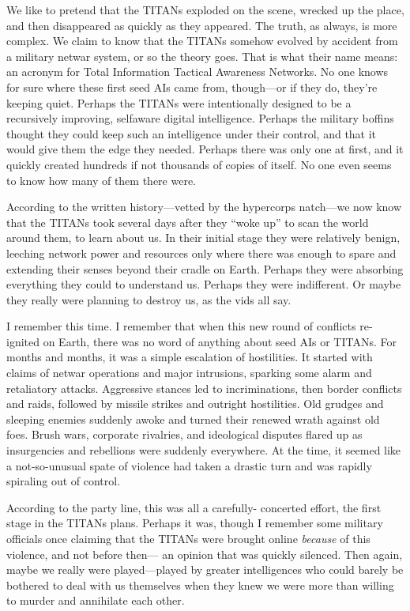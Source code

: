 We like to pretend that the TITANs exploded on 
the scene, wrecked up the place, and then disappeared 
as quickly as they appeared. The truth, as always, is 
more complex. We claim to know that the TITANs 
somehow evolved by accident from a military netwar 
system, or so the theory goes. That is what their name 
means: an acronym for Total Information Tactical 
Awareness Networks. No one knows for sure where 
these first seed AIs came from, though—or if they do, 
they're keeping quiet. Perhaps the TITANs were intentionally designed to be a recursively improving, selfaware digital intelligence. Perhaps the military boffins 
thought they could keep such an intelligence under 
their control, and that it would give them the edge 
they needed. Perhaps there was only one at first, and 
it quickly created hundreds if not thousands of copies 
of itself. No one even seems to know how many of 
them there were.

According to the written history—vetted by the hypercorps natch—we now know that the TITANs took 
several days after they ``woke up'' to scan the world 
around them, to learn about us. In their initial stage 
they were relatively benign, leeching network power 
and resources only where there was enough to spare 
and extending their senses beyond their cradle on 
Earth. Perhaps they were absorbing everything they 
could to understand us. Perhaps they were indifferent. 
Or maybe they really were planning to destroy us, as 
the vids all say.

I remember this time. I remember that when this 
new round of conflicts re-ignited on Earth, there 
was no word of anything about seed AIs or TITANs. 
For months and months, it was a simple escalation 
of hostilities. It started with claims of netwar operations and major intrusions, sparking some alarm and 
retaliatory attacks. Aggressive stances led to incriminations, then border conflicts and raids, followed by 
missile strikes and outright hostilities. Old grudges 
and sleeping enemies suddenly awoke and turned 
their renewed wrath against old foes. Brush wars, 
corporate rivalries, and ideological disputes flared up 
as insurgencies and rebellions were suddenly everywhere. At the time, it seemed like a not-so-unusual 
spate of violence had taken a drastic turn and was 
rapidly spiraling out of control.

According to the party line, this was all a carefully-
concerted effort, the first stage in the TITANs plans. 
Perhaps it was, though I remember some military officials once claiming that the TITANs were brought 
online \textit{because} of this violence, and not before then—
an opinion that was quickly silenced. Then again, 
maybe we really were played—played by greater intelligences who could barely be bothered to deal with 
us themselves when they knew we were more than 
willing to murder and annihilate each other.

